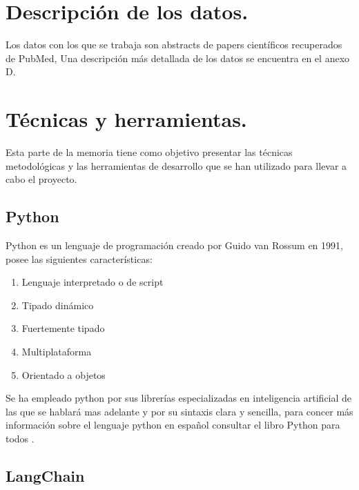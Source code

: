 
\section{Descripción de los datos.}

Los datos con los que se trabaja son abstracts de papers científicos recuperados de PubMed, 
Una descripción más detallada de los datos se encuentra en el anexo D.


\section{Técnicas y herramientas.}

Esta parte de la memoria tiene como objetivo presentar las técnicas metodológicas y las herramientas de desarrollo que se han utilizado para llevar a cabo el proyecto.

\subsection{Python}

Python es un lenguaje de programación creado por Guido van Rossum en 1991, posee las siguientes características:

\begin{enumerate}
    \item Lenguaje interpretado o de script
    
    \item  Tipado dinámico

    \item  Fuertemente tipado

    \item  Multiplataforma

    \item  Orientado a objetos
    
\end{enumerate}

Se ha empleado python por sus librerías especializadas en inteligencia artificial de las que se hablará mas adelante y por su sintaxis clara y sencilla, para concer más información sobre el lenguaje python en español consultar el libro Python para todos \cite{gonzalez2011python}.

\subsection{LangChain}

